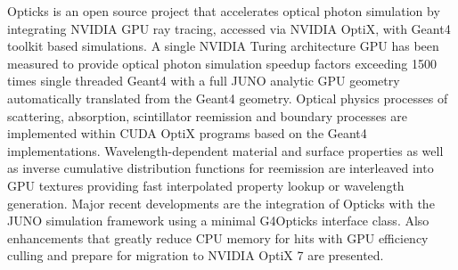 Opticks is an open source project that accelerates optical photon simulation by 
integrating NVIDIA GPU ray tracing, accessed via NVIDIA OptiX, with 
Geant4 toolkit based simulations. 
A single NVIDIA Turing architecture GPU has been measured to provide optical 
photon simulation speedup factors exceeding 1500 times single threaded Geant4 
with a full JUNO analytic GPU geometry automatically translated from the Geant4 geometry.
%
Optical physics processes of scattering, absorption, scintillator reemission and 
boundary processes are implemented within CUDA OptiX programs based on the Geant4
implementations. Wavelength-dependent material and surface properties as well as  
inverse cumulative distribution functions for reemission are interleaved into 
GPU textures providing fast interpolated property lookup or wavelength generation.
%
Major recent developments are the integration of Opticks with the JUNO simulation 
framework using a minimal G4Opticks interface class. Also enhancements 
that greatly reduce CPU memory for hits with GPU efficiency culling 
and prepare for migration to NVIDIA OptiX 7 are presented.

